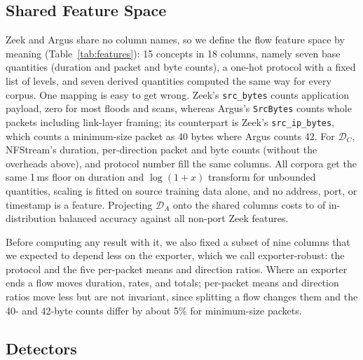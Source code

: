 \documentclass{ieeeaccess}
\newcommand{\DA}{\ensuremath{\mathcal{D}_{A}}}
\newcommand{\DC}{\ensuremath{\mathcal{D}_{C}}}
\begin{document}
\subsection{Shared Feature Space}
\label{sec:shared}

Zeek and Argus share no column names, so we define the flow feature space by meaning (Table~\ref{tab:features}): 15 concepts in 18 columns, namely seven base quantities (duration and packet and byte counts), a one-hot protocol with a fixed list of levels, and seven derived quantities computed the same way for every corpus. One mapping is easy to get wrong. Zeek's \texttt{src\_bytes} counts application payload, zero for most floods and scans, whereas Argus's \texttt{SrcBytes} counts whole packets including link-layer framing; its counterpart is Zeek's \texttt{src\_ip\_bytes}, which counts a minimum-size packet as 40 bytes where Argus counts 42. For \DC{}, NFStream's duration, per-direction packet and byte counts (without the overheads above), and protocol number fill the same columns. All corpora get the same 1\,ms floor on duration and $\log(1+x)$ transform for unbounded quantities, scaling is fitted on source training data alone, and no address, port, or timestamp is a feature. Projecting \DA{} onto the shared columns costs \HarmBAmin{} to \HarmBAmax{} of in-distribution balanced accuracy against all \NFullFeat{} non-port Zeek features.

Before computing any result with it, we also fixed a subset of nine columns that we expected to depend less on the exporter, which we call exporter-robust: the protocol and the five per-packet means and direction ratios. Where an exporter ends a flow moves duration, rates, and totals; per-packet means and direction ratios move less but are not invariant, since splitting a flow changes them and the 40- and 42-byte counts differ by about 5\% for minimum-size packets.

\begin{table}[t]
\caption{Shared flow feature space, generated from \texttt{configs/features/shared\_space.yaml}. The exporter-robust subset is the protocol one-hot, the three mean packet sizes, and the two direction ratios.}
\label{tab:features}
\centering
\scriptsize
\setlength{\tabcolsep}{3pt}

\end{table}

\subsection{Detectors}
\label{sec:detectors}
\end{document}
